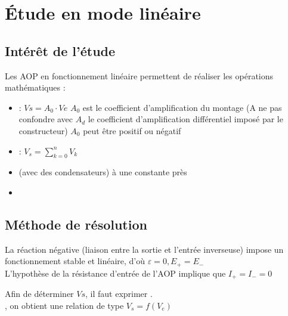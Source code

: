 

\chapter{Étude en mode linéaire}
\section{Intérêt de l’étude }

Les AOP en fonctionnement linéaire permettent de réaliser les opérations mathématiques :

\begin{itemize}
  \item {} : $Vs=A_0 \cdot Ve$
  $A_0$ est le coefficient d’amplification du montage (A ne pas confondre avec $A_d$ le coefficient d’amplification différentiel imposé par le constructeur)
  $A_0$ peut être positif ou négatif
  \item {} : $V_s=\sum_{k=0}^{n} V_k$
  \item {} (avec des condensateurs) à une constante près
  \item {}
\end{itemize}

\section{Méthode de résolution}
La {\color{red}réaction négative} (liaison entre la sortie et l’entrée inverseuse) impose un fonctionnement stable et linéaire, d'où {\color{red}$\varepsilon=0, E_+=E_-$} \\

L’hypothèse de la résistance d’entrée de l’AOP implique que $I_+=I_-=0$

Afin de déterminer $Vs$, il faut exprimer . \\

, on obtient une relation de type $V_s = f(V_e)$


